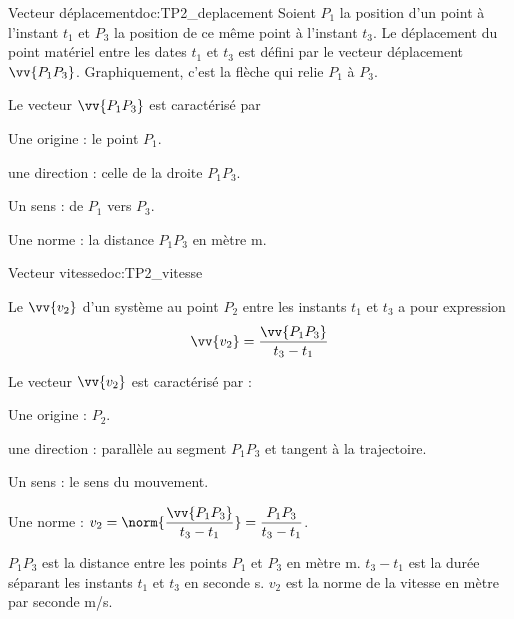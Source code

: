 \newpage
\vspace*{-40pt}
\begin{doc}{Vecteur déplacement}{doc:TP2_deplacement}
  Soient $P_1$ la position d'un point à l'instant $t_1$ et $P_3$ la position de ce même point à l'instant $t_3$.
  Le déplacement du point matériel entre les dates $t_1$ et $t_3$ est défini par le vecteur déplacement $\vv{P_1 P_3}$.
  Graphiquement, c'est la flèche qui relie $P_1$ à $P_3$. 
  
  Le vecteur $\vv{P_1 P_3}$ est caractérisé par
  \vspace*{-8pt}
  \begin{multicols}{2}
  \begin{listePoints}
    \item Une origine : le point $P_1$.
    \item une direction : celle de la droite $P_1 P_3$.
    \item Un sens : de $P_1$ vers $P_3$.
    \item Une norme : la distance $P_1 P_3$ en mètre \unit{m}.
  \end{listePoints}
  \end{multicols}
\end{doc}

\begin{doc}{Vecteur vitesse}{doc:TP2_vitesse}
  \begin{importants}
    Le  $\vv{v_2}$ d'un système au point $P_2$ entre les instants $t_1$ et $t_3$ a pour expression
    \begin{equation*}
      \vv{v_2} = \frac{\vv{P_1 P_3}}{t_3 - t_1}
    \end{equation*}
  \end{importants}
  
  Le vecteur $\vv{v_2}$ est caractérisé par :
  \vspace*{-8pt}
  \begin{multicols}{2}
  \begin{listePoints}
    \item Une origine : $P_2$.
    \item une direction : parallèle au segment $P_1 P_3$ et tangent à la trajectoire.
    \item Un sens : le sens du mouvement.
    \item Une norme : $v_2 
    = \displaystyle \norm{\frac{\vv{P_1 P_3}}{t_3 - t_1}}
    = \displaystyle \frac{P_1 P_3}{t_3 - t_1}$.
  \end{listePoints}
  \end{multicols}
  
  $P_1 P_3$ est la distance entre les points $P_1$ et $P_3$ en mètre \unit{\m}.
  $t_3 - t_1$ est la durée séparant les instants $t_1$ et $t_3$ en seconde \unit{\s}.
  $v_2$ est la norme de la vitesse en mètre par seconde \unit{\m/\s}.
\end{doc}



